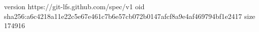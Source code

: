 version https://git-lfs.github.com/spec/v1
oid sha256:a6c4218a11e22c5e67e461c7b6e57cb072b0147afcf8a9e4af469794bf1e2417
size 174916

